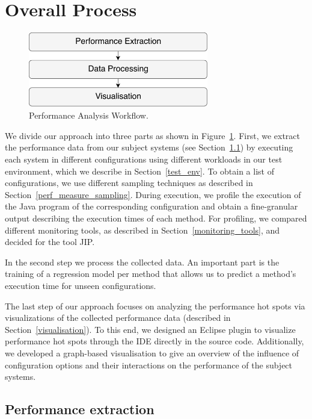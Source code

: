\section{Overall Process}
\label{overall_process}

\begin{figure}
  \centering
  \includegraphics[width=0.7\textwidth]{images/workflow_overview_0}
  \caption{Performance Analysis Workflow.}
  \label{big_picture_perf_anal_workflow}
\end{figure}

We divide our approach into three parts as shown in Figure~\ref{big_picture_perf_anal_workflow}. First, we extract the performance data from our subject systems (see Section~\ref{perf_extr}) by executing each system in different configurations using different workloads in our test environment, which we describe in Section~\ref{test_env}. To obtain a list of configurations, we use different sampling techniques as described in Section~\ref{perf_measure_sampling}. During execution, we profile the execution of the Java program of the corresponding configuration and obtain a fine-granular output describing the execution times of each method. For profiling, we compared different monitoring tools, as described in Section~\ref{monitoring_tools}, and decided for the tool \ac{JIP}. 

In the second step we process the collected data. An important part is the training of a regression model per method that allows us to predict a method's execution time for unseen configurations. 

The last step of our approach focuses on analyzing the performance hot spots via visualizations of the collected performance data (described in Section~\ref{visualisation}). To this end, we designed an Eclipse plugin to visualize performance hot spots through the \ac{IDE} directly in the source code. Additionally, we developed a graph-based visualisation to give an overview of the influence of configuration options and their interactions on the performance of the subject systems.


\subsection{Performance extraction}
\label{perf_extr}

